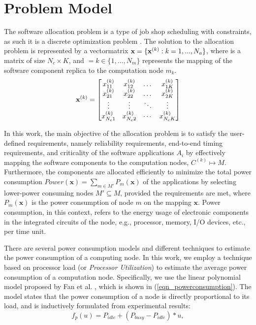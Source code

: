\section{Problem Model}\label{sec_problem}
The software allocation problem is a type of job shop scheduling with constraints, as such it is a discrete optimization problem \cite{}. The solution to the allocation problem is represented by a vectormatrix $\textbf{x}=\{\textbf{x}^{(k)}:k=1,...,N_a\}$, where  is a matrix of size $N_c\times K$, and $=k\in \{1,…,N_m\}$ represents the mapping of the software component replica  to the computation node $m_k$.
\begin{equation}
\label{fig_pso_solution_representation}
\textbf{x}^{(k)}=
\begin{bmatrix} 
x^{(k)}_{11} & x^{(k)}_{12} & \dots & x^{(k)}_{1K}\\
x^{(k)}_{21} & x^{(k)}_{22} & \dots & x^{(k)}_{2K}\\
\vdots & \vdots & \ddots & \vdots\\
x^{(k)}_{N_c1} & x^{(k)}_{N_c2} & \cdots & x^{(k)}_{N_cK}
\end{bmatrix}
\end{equation}

In this work, the main objective of the allocation problem is to satisfy the user-defined requirements, namely reliability requirements, end-to-end timing requirements, and criticality of the software applications $A_i$ by effectively mapping the software components to the computation nodes, $C^{(k)}\mapsto M$. Furthermore, the components are allocated efficiently to minimize the total power consumption $Power(\textbf{x})=\sum_{m\in M'}{P_{m}(\textbf{x})}$ of the applications by selecting lower-power consuming nodes $M'\subseteq M$, provided the requirements are met, where $P_{m}(\textbf{x})$ is the power consumption of node $m$ on the mapping $\textbf{x}$. Power consumption, in this context, refers to the energy usage of electronic components in the integrated circuits of the node, e.g., processor, memory, I/O devices, etc., per time unit. 

There are several power consumption models and different techniques to estimate the power consumption of a computing node. In this work, we employ a technique based on processor load (or \textit{Processor Utilization}) to estimate the average power consumption of a computation node. Specifically, we use the linear polynomial model proposed by Fan et al. \cite{Fan2007PowerComputer}, which is shown in (\ref{eqn_powerconsumption}). The model states that the power consumption of a node is directly proportional to its load, and is inductively formulated from experimental results:
\begin{equation}
\label{eqn_powerconsumption}
f_p(u)=P_{idle} + (P_{busy}-P_{idle})*u,
\end{equation}

